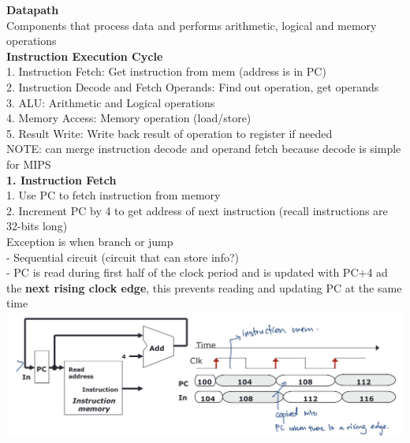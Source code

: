 \documentclass[10pt, a4paper]{article}
\begin{document}
\begin{multicols*}{3}
		{\normalsize\textbf{Datapath}}\\
		Components that process data and performs arithmetic, logical and memory operations\\
		
		\textbf{Instruction Execution Cycle}\\
		1. Instruction Fetch: Get instruction from mem (address is in PC)\\
		2. Instruction Decode and Fetch Operands: Find out operation, get operands\\
		3. ALU: Arithmetic and Logical operations\\
		4. Memory Access: Memory operation (load/store)\\
		5. Result Write: Write back result of operation to register if needed\\
		NOTE: can merge instruction decode and operand fetch because decode is simple for MIPS\\
		
		\textbf{1. Instruction Fetch}\\
		1. Use PC to fetch instruction from memory\\
		2. Increment PC by 4 to get address of next instruction (recall instructions are 32-bits long)\\
		Exception is when branch or jump\\
		- Sequential circuit (circuit that can store info?)\\
		- PC is read during first half of the clock period and is updated with PC+4 ad the \textbf{next rising clock edge}, this prevents reading and updating PC at the same time\\
		\includegraphics[scale=.15]{./assets/clock}\\
		

\end{multicols*}
\end{document}

